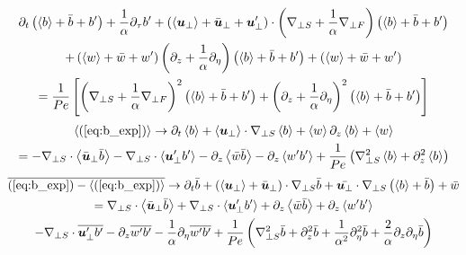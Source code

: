 \documentclass{article}
\begin{document}
\begin{multline}
    \partial_t\left(\left<b\right> + \bar{b} + b'\right) +
    \frac{1}{\alpha}\partial_{\tau}b' + \left(\left<\boldsymbol{u}_{\perp}\right> + \bar{\boldsymbol{u}}_{\perp} + \boldsymbol{u}'_{\perp}\right)\cdot\left(\nabla_{\perp S} +
    \frac{1}{\alpha}\nabla_{\perp F}\right)\left(\left<b\right> + \bar{b} + b'\right) \\+ \left(\left<w\right> + \bar{w} + w'\right)\left(\partial_z +
    \frac{1}{\alpha}\partial_{\eta}\right)\left(\left<b\right> + \bar{b} + b'\right) + \left(\left<w\right> + \bar{w} + w'\right) \label{eq:b_exp}\\
     = \frac{1}{Pe}\left[\left(\nabla_{\perp S} + \frac{1}{\alpha}\nabla_{\perp F}\right)^2
    \left(\left<b\right> + \bar{b} + b'\right) + \left(\partial_z +
    \frac{1}{\alpha}\partial_{\eta}\right)^2\left(\left<b\right> + \bar{b} + b'\right)\right]
\end{multline}
\begin{multline}
    \left<(\ref{eq:b_exp})\right> \to \partial_t \left<b\right> +
    \left<\boldsymbol{u}_{\perp}\right>\cdot\nabla_{\perp S}\left<b\right> 
     + \left<w\right>\partial_z\left<b\right> 
     + \left<w\right>\\
    = -\nabla_{\perp S}\cdot\left<\bar{\boldsymbol{u}}_{\perp} \bar{b}\right> -
    \nabla_{\perp S}\cdot\left<\boldsymbol{u}'_{\perp} b'\right>-\partial_z\left<\bar{w}\bar{b}\right> - \partial_z\left<w'b'\right>
    + \frac{1}{Pe}\left(\nabla_{\perp S}^2\left<b\right> + \partial_z^2\left<b\right>\right) 
    \label{eq:b_bracket_eq}
\end{multline}
\begin{multline}
    \overline{(\ref{eq:b_exp}) - \left<(\ref{eq:b_exp})\right>} \to \partial_t \bar{b} +
    \left(\left<\boldsymbol{u}_{\perp}\right> + \bar{\boldsymbol{u}}_{\perp}\right)\cdot\nabla_{\perp S} \bar{b} +
    \bar{\boldsymbol{u}_{\perp}} \cdot\nabla_{\perp S}\left(\left<b\right> + \bar{b}\right) + \bar{w} \\
    = \nabla_{\perp S}\cdot\left<\bar{\boldsymbol{u}}_{\perp}\bar{b}\right>+ 
    \nabla_{\perp S}\cdot\left<\boldsymbol{u}_{\perp}'b'\right> + \partial_z\left<\bar{w}\bar{b}\right> +
    \partial_z\left<w'b'\right> \\
    - \nabla_{\perp S}\cdot\overline{\boldsymbol{u}_{\perp}'b'} -
    \partial_z\overline{w'b'} - \frac{1}{\alpha}\partial_{\eta}\overline{w'b'} +
    \frac{1}{Pe}\left(\nabla_{\perp S}^2\bar{b} + \partial_z^2\bar{b} +
    \frac{1}{\alpha^2}\partial_{\eta}^2\bar{b} +
    \frac{2}{\alpha}\partial_z\partial_{\eta}\bar{b}\right)
    \label{eq:b_bar_eq}
\end{multline}
\end{document}
